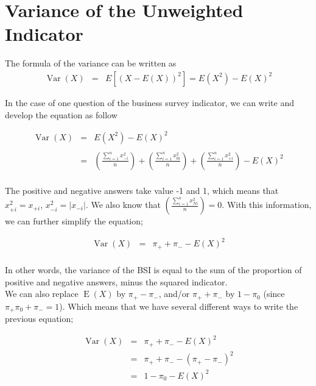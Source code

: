 \documentclass[12pt,a4paper,oneside]{book}
\DeclareMathOperator{\Var}{Var}
\DeclareMathOperator{\E}{E}
\begin{document}
\section{Variance of the Unweighted Indicator}


\nocite{alcaniz_calculation_2006}

The formula of the variance can be written as 
\begin{eqnarray}
         \Var(X) &=& E \left[ \left(X-E(X) \right)^2 \right] =  E\left( X^2\right) - E\left( X\right)^2
\end{eqnarray}

In the case of one question of the business survey indicator, we can write and develop the equation as follow

\begin{eqnarray}
\Var(X) &=&  E\left( X^2\right) - E\left( X\right)^2 \nonumber \\ \nonumber \\
    &=& \left( \frac{\sum_{i=1}^n x_{-i}^2}{n} \right) + \left( \frac{\sum_{i=1}^n x_{0i}^2}{n} \right) + \left( \frac{\sum_{i=1}^n x_{+i}^2}{n} \right) - E(X)^2 \\ \nonumber 
\end{eqnarray}


The positive and negative answers take value -1 and 1, which means that $x_{+i}^2 = x_{+i}$, $x_{-i}^2 = |x_{-i}|$. We also know that $\left( \frac{\sum_{i=1}^n x_{Ni}^2}{n} \right) = 0$. 
With this information, we can further simplify the equation;

\begin{eqnarray}
	\Var(X) &=& \pi_+ + \pi_- - E ( X )^2 \label{var1} \\ \nonumber
\end{eqnarray}

In other words, the variance of the BSI is equal to the sum of the proportion of positive and negative answers, minus the squared indicator. \\
We can also replace $\E(X)$  by $\pi_+ - \pi_-$, and/or $\pi_+ + \pi_-$ by $ 1 - \pi_0$ (since $\pi_+ \pi_0 + \pi_- = 1$).
Which means that we have several different ways to write the previous equation;

\begin{eqnarray}
\Var(X) &=& \pi_+ + \pi_- - E ( X )^2  \nonumber \\
        &=& \pi_+ + \pi_- - ( \pi_+ - \pi_- )^2 \label{var2} \\
	    &=& 1 - \pi_0 - E(X)^2 \label{var3}
\end{eqnarray}
\end{document}
